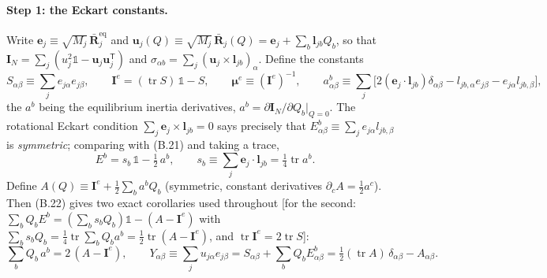 \paragraph{Step 1: the Eckart constants.}
Write $\mathbf e_j\equiv\sqrt{M_j}\,\bar{\mathbf R}^{\mathrm{eq}}_j$ and $\mathbf u_j(Q)\equiv\sqrt{M_j}\,\bar{\mathbf R}_j(Q)=\mathbf e_j+\sum_b\mathbf l_{jb}Q_b$, so that $\mathbf I_N=\sum_j(u_j^2\mathbb 1-\mathbf u_j\mathbf u_j^{\mathsf T})$ and $\sigma_{\alpha b}=\sum_j(\mathbf u_j\times\mathbf l_{jb})_\alpha$. Define the constants
\begin{equation}
S_{\alpha\beta}\equiv\sum_j e_{j\alpha}e_{j\beta},\qquad
\mathbf I^{e}=(\operatorname{tr}S)\,\mathbb 1-S,\qquad
\boldsymbol\mu^{e}\equiv(\mathbf I^{e})^{-1},\qquad
a^{b}_{\alpha\beta}\equiv\sum_j\bigl[2(\mathbf e_j\!\cdot\!\mathbf l_{jb})\delta_{\alpha\beta}-l_{jb,\alpha}e_{j\beta}-e_{j\alpha}l_{jb,\beta}\bigr], \tag{B.21}
\end{equation}
the $a^{b}$ being the equilibrium inertia derivatives, $a^b=\partial\mathbf I_N/\partial Q_b|_{Q=0}$. The rotational Eckart condition $\sum_j\mathbf e_j\times\mathbf l_{jb}=0$ says precisely that $E^{b}_{\alpha\beta}\equiv\sum_je_{j\alpha}l_{jb,\beta}$ is \emph{symmetric}; comparing with (B.21) and taking a trace,
\begin{equation}
E^{b}=s_b\,\mathbb 1-\tfrac12\,a^{b},\qquad
s_b\equiv\sum_j\mathbf e_j\!\cdot\!\mathbf l_{jb}=\tfrac14\operatorname{tr}a^{b}. \tag{B.22}
\end{equation}
Define $A(Q)\equiv\mathbf I^{e}+\tfrac12\sum_b a^{b}Q_b$ (symmetric, constant derivatives $\partial_cA=\tfrac12a^c$). Then (B.22) gives two exact corollaries used throughout [for the second: $\sum_bQ_bE^b=(\sum_bs_bQ_b)\mathbb 1-(A-\mathbf I^e)$ with $\sum_bs_bQ_b=\tfrac14\operatorname{tr}\!\sum_bQ_ba^b=\tfrac12\operatorname{tr}(A-\mathbf I^e)$, and $\operatorname{tr}\mathbf I^e=2\operatorname{tr}S$]:
\begin{equation}
\sum_bQ_b\,a^{b}=2\,(A-\mathbf I^{e}),
\qquad
Y_{\alpha\beta}\equiv\sum_ju_{j\alpha}e_{j\beta}=S_{\alpha\beta}+\sum_bQ_bE^b_{\alpha\beta}
=\tfrac12(\operatorname{tr}A)\,\delta_{\alpha\beta}-A_{\alpha\beta}. \tag{B.23}
\end{equation}

